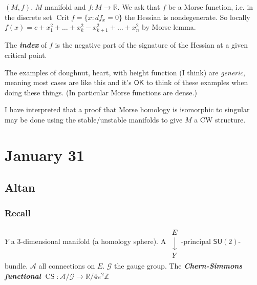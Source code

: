 \((M,f)\), \(M\) manifold and \(f:M\to \mathbb{R}\). We ask that $f$ be a Morse
function, i.e. in the discrete set \(\operatorname{Crit}f=\{x:df_x=0\}\) the
Hessian is nondegenerate. So locally
\(f(x)=c+x_1^2+\ldots+x_k^2-x^2_{k+1}+\ldots+x_n^2\) by Morse lemma.

The \textit{\textbf{index}} of \(f\) is the negative part of the signature of
the Hessian at a given critical point.

\begin{remark}[Lucas]\leavevmode
The examples of doughnut, heart, with height function (I think) are
\textit{generic}, meaning most cases are like this and it's $\mathsf{OK}$ to
think of these examples when doing these things. (In particular Morse functions
are dense.)
\end{remark}

I have interpreted that a proof that Morse homology is isomorphic to singular
may be done using the stable/unstable manifolds to give \(M\) a CW structure.

\section{January 31}

\subsection{Altan}

\subsubsection{Recall}

\(Y\) a 3-dimensional manifold (a homology sphere). A \(\begin{tikzcd}
E\arrow[d]\\
Y
\end{tikzcd}\)-principal \(\mathsf{SU}(2)\)-bundle. \(\mathcal{A}\) all
connections on \(E\). \(\mathcal{G}\) the gauge group. The
\textit{\textbf{Chern-Simmons functional}} \(\operatorname{ C S}:
\mathcal{A}/\mathcal{G}\to \mathbb{R}/4\pi^2\mathbb{Z}\)




%

